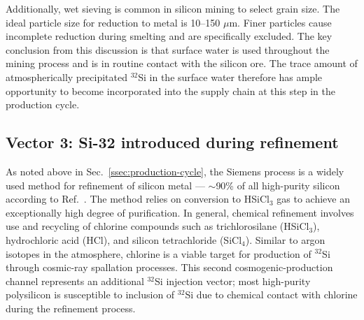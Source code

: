 \documentclass[final,5p]{elsarticle}
\def\si{$^{32}$Si\xspace}
\begin{document}
Additionally, wet sieving is common in silicon mining to select grain size. The ideal particle size for reduction to metal is 10--150 $\mu$m. Finer particles cause incomplete reduction during smelting and are specifically excluded. The key conclusion from this discussion is that surface water is used throughout the mining process and is in routine contact with the silicon ore. The trace amount of atmospherically precipitated \si in the surface water therefore has ample opportunity to become incorporated into the supply chain at this step in the production cycle.

\subsection{Vector 3: Si-32 introduced during refinement}\label{ssec:vector3}
As noted above in Sec.\ \ref{ssec:production-cycle}, the Siemens process is a widely used method for refinement of silicon metal --- $\sim$90\% of all high-purity silicon according to Ref.\ \cite{metallurgic}. The method relies on conversion to HSiCl$_3$ gas to achieve an exceptionally high degree of purification. In general, chemical refinement involves use and recycling of chlorine compounds such as  trichlorosilane (HSiCl$_3$), hydrochloric acid (HCl), and silicon tetrachloride (SiCl$_4$). Similar to argon isotopes in the atmosphere, chlorine is a viable target for production of \si through cosmic-ray spallation processes. This second cosmogenic-production channel represents an additional \si injection vector; most high-purity polysilicon is susceptible to inclusion of \si due to chemical contact with chlorine during the refinement process.
\end{document}
